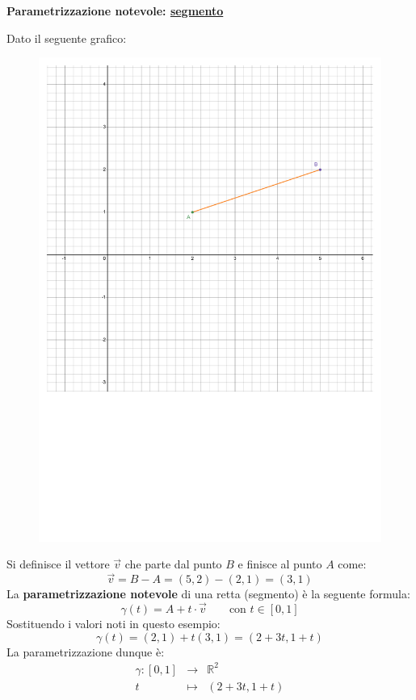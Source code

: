 \documentclass[a4paper]{article}
\newcommand{\definition}[1]{\textcolor{Red3}{\textbf{#1}}}
\begin{document}
	\begin{flushleft}\label{parametrizzazione notevole: segmento}
		\definition{Parametrizzazione notevole: \underline{segmento}}
	\end{flushleft}
	Dato il seguente grafico:
	\begin{figure}[!htp]
		\centering
		\includegraphics[width=.8\textwidth]{img/parametrizzazioni_notevoli-1.pdf}
	\end{figure}

	\noindent
	Si definisce il vettore $\overrightarrow{v}$ che parte dal punto $B$ e finisce al punto $A$ come:
	\begin{equation*}
		\overrightarrow{v} = B - A = \left(5,2\right) - \left(2,1\right) = \left(3,1\right)
	\end{equation*}
	La \textbf{parametrizzazione notevole} di una retta (segmento) è la seguente formula:
	\begin{equation}\label{eq: parametrizzazione notevole: segmento o retta}
		\gamma\left(t\right) = A + t \cdot \overrightarrow{v} \hspace{2em} \text{con } t \in \left[0,1\right]
	\end{equation}
	Sostituendo i valori noti in questo esempio:
	\begin{equation*}
		\gamma\left(t\right) = \left(2,1\right) + t\left(3,1\right) = \left(2 + 3t, 1 + t\right)
	\end{equation*}
	La parametrizzazione dunque è:
	\begin{equation*}
		\begin{array}{rcl}
			\gamma : \left[0,1\right] &\rightarrow& \mathbb{R}^{2} \\
			t &\mapsto& \left(2+3t, 1+t\right)
		\end{array}
	\end{equation*}\newpage
\end{document}
